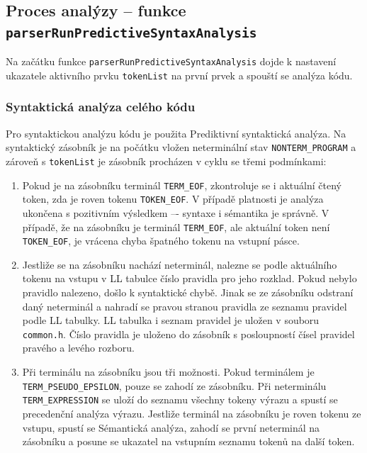 \documentclass[a4paper, 12pt]{article}
\begin{document}
\subsection{Proces analýzy -- funkce \protect\Verb|parserRunPredictiveSyntaxAnalysis|}
Na začátku funkce \verb|parserRunPredictiveSyntaxAnalysis| dojde k nastavení ukazatele aktivního prvku \verb|tokenList| na první prvek a spouští se analýza kódu.

\subsubsection{Syntaktická analýza celého kódu}
Pro syntaktickou analýzu kódu je použita Prediktivní syntaktická analýza. Na syntaktický zásobník je na počátku vložen neterminální stav \verb|NONTERM_PROGRAM| a zároveň s \verb|tokenList| je zásobník procházen v cyklu se třemi podmínkami:

\begin{enumerate}
    \item Pokud je na zásobníku terminál \verb|TERM_EOF|, zkontroluje se i aktuální čtený token, zda je roven tokenu \verb|TOKEN_EOF|. V případě platnosti je analýza ukončena s pozitivním výsledkem –- syntaxe i sémantika je správně. V případě, že na zásobníku je terminál \verb|TERM_EOF|, ale aktuální token není \verb|TOKEN_EOF|, je vrácena chyba špatného tokenu na vstupní pásce.
    \newpage
    \item Jestliže se na zásobníku nachází neterminál, nalezne se podle aktuálního tokenu na vstupu
    v LL tabulce číslo pravidla pro jeho rozklad. Pokud nebylo pravidlo nalezeno, došlo k syntaktické chybě. Jinak se ze zásobníku odstraní daný neterminál a nahradí se pravou stranou pravidla ze seznamu pravidel podle LL tabulky. LL tabulka i seznam pravidel je uložen v souboru \verb|common.h|. Číslo pravidla je uloženo do zásobník s posloupností čísel pravidel pravého a levého rozboru.
    \item Při terminálu na zásobníku jsou tři možnosti. Pokud terminálem je \verb|TERM_PSEUDO_EPSILON|, pouze se zahodí ze zásobníku. Při neterminálu \verb|TERM_EXPRESSION| se uloží do seznamu všechny tokeny výrazu a spustí se precedenční analýza výrazu. Jestliže terminál na zásobníku je roven tokenu ze vstupu, spustí se Sémantická analýza, zahodí se první neterminál na zásobníku a posune se ukazatel na vstupním seznamu tokenů na další token.
\end{enumerate}
\end{document}
